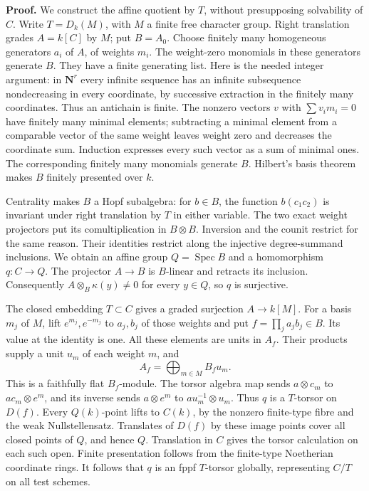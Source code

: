 \documentclass[11pt,a4paper,openany]{report}
\begin{document}
\textbf{Proof.} We construct the affine quotient by \(T\), without presupposing solvability of \(C\). Write \(T=D_k(M)\), with \(M\) a finite free character group. Right translation grades \(A=k[C]\) by \(M\); put \(B=A_0\). Choose finitely many homogeneous generators \(a_i\) of \(A\), of weights \(m_i\). The weight-zero monomials in these generators generate \(B\). They have a finite generating list. Here is the needed integer argument: in \(\mathbf N^r\) every infinite sequence has an infinite subsequence nondecreasing in every coordinate, by successive extraction in the finitely many coordinates. Thus an antichain is finite. The nonzero vectors \(v\) with \(\sum v_i m_i=0\) have finitely many minimal elements; subtracting a minimal element from a comparable vector of the same weight leaves weight zero and decreases the coordinate sum. Induction expresses every such vector as a sum of minimal ones. The corresponding finitely many monomials generate \(B\). Hilbert's basis theorem makes \(B\) finitely presented over \(k\).

Centrality makes \(B\) a Hopf subalgebra: for \(b\in B\), the function \(b(c_1c_2)\) is invariant under right translation by \(T\) in either variable. The two exact weight projectors put its comultiplication in \(B\otimes B\). Inversion and the counit restrict for the same reason. Their identities restrict along the injective degree-summand inclusions. We obtain an affine group \(Q=\operatorname{Spec}B\) and a homomorphism \(q:C\to Q\). The projector \(A\to B\) is \(B\)-linear and retracts its inclusion. Consequently \(A\otimes_B\kappa(y)\ne0\) for every \(y\in Q\), so \(q\) is surjective.

The closed embedding \(T\subset C\) gives a graded surjection \(A\to k[M]\). For a basis \(m_j\) of \(M\), lift \(e^{m_j},e^{-m_j}\) to \(a_j,b_j\) of those weights and put \(f=\prod_j a_jb_j\in B\). Its value at the identity is one. All these elements are units in \(A_f\). Their products supply a unit \(u_m\) of each weight \(m\), and \[
 A_f=\bigoplus_{m\in M}B_f u_m.
\] This is a faithfully flat \(B_f\)-module. The torsor algebra map sends \(a\otimes c_m\) to \(ac_m\otimes e^m\), and its inverse sends \(a\otimes e^m\) to \(a u_m^{-1}\otimes u_m\). Thus \(q\) is a \(T\)-torsor on \(D(f)\). Every \(Q(k)\)-point lifts to \(C(k)\), by the nonzero finite-type fibre and the weak Nullstellensatz. Translates of \(D(f)\) by these image points cover all closed points of \(Q\), and hence \(Q\). Translation in \(C\) gives the torsor calculation on each such open. Finite presentation follows from the finite-type Noetherian coordinate rings. It follows that \(q\) is an fppf \(T\)-torsor globally, representing \(C/T\) on all test schemes.
\end{document}
